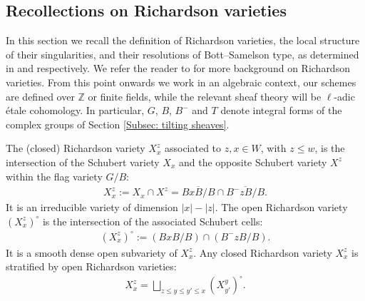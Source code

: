 \documentclass[11pt]{article}
\theoremstyle{remark}
\theoremstyle{definition}
\begin{document}
    
    
\subsection{Recollections on Richardson varieties}
\label{Ssec: Richardson}
	In this section we recall the definition of Richardson varieties, the local structure of their singularities, and their resolutions of Bott--Samelson type, as determined in \cite{KWY13} and \cite{KLS14} respectively.
	 We refer the reader to \cite{Ri92,De85, KLS14, Sp24} for more background on Richardson varieties. From this point onwards we work in an algebraic context, our schemes are defined over $\mathbb{Z}$ or finite fields, while the relevant sheaf theory will be $\ell$-adic \'{e}tale cohomology. In particular, $G$, $B$, $B^-$ and $T$ denote integral forms of the complex groups of Section \ref{Subsec: tilting sheaves}. 
    \\
    \par 
	The (closed) Richardson variety $X^z_x$ associated to $z,x \in W$, with $ z \leq w$, is the intersection of the Schubert variety $X_x$ and the opposite Schubert variety $X^z$ within the flag variety $G/B$:
	\begin{align}
		X^z_x:=X_x\cap X^z=\overline{BxB/B}\cap \overline{B^{-}zB/B}.
	\end{align}
	It is an irreducible variety of dimension $|x|-|z|$. The open Richardson variety $(X^z_x)^\circ$ is the intersection of the associated Schubert cells:
	\begin{align}
		(X^z_x)^\circ:=(BxB/B) \cap (B^{-}zB/B).
	\end{align}
	It is a smooth dense open subvariety of $X^z_x$.
	Any closed Richardson variety $X^z_x$ is stratified by open Richardson varieties:
	\begin{align}
\label{Richardson_strat}
    	X^z_x=\bigsqcup_{z\leq y\leq y'\leq x}(X^y_{y'})^\circ.
	\end{align}
\end{document}
